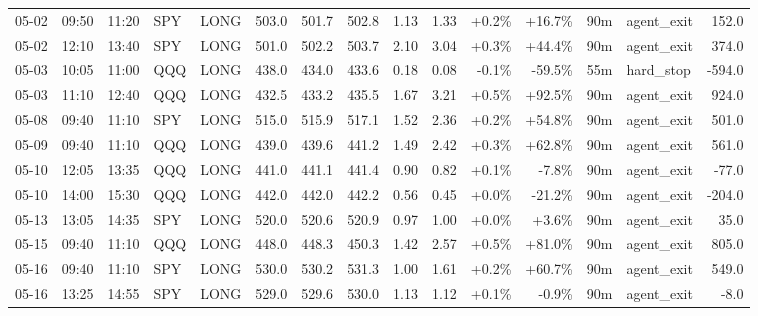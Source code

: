 \documentclass[11pt,a4paper,twoside]{article}
\begin{document}
\begin{landscape}
\begin{center}
\begin{longtable}{>{\color{txtmain}}l l l l l r r r r r r r r >{\color{txtmain}}l r}
05-02 & 09:50 & 11:20 & SPY & LONG & 503.0 & 501.7 & 502.8 & 1.13 & 1.33 & \textcolor{wingreen}{+0.2\%} & \textcolor{wingreen}{+16.7\%} & 90m & agent\_exit & \textcolor{wingreen}{152.0} \\
05-02 & 12:10 & 13:40 & SPY & LONG & 501.0 & 502.2 & 503.7 & 2.10 & 3.04 & \textcolor{wingreen}{+0.3\%} & \textcolor{wingreen}{+44.4\%} & 90m & agent\_exit & \textcolor{wingreen}{374.0} \\
05-03 & 10:05 & 11:00 & QQQ & LONG & 438.0 & 434.0 & 433.6 & 0.18 & 0.08 & \textcolor{lossred}{-0.1\%} & \textcolor{lossred}{-59.5\%} & 55m & hard\_stop & \textcolor{lossred}{-594.0} \\
05-03 & 11:10 & 12:40 & QQQ & LONG & 432.5 & 433.2 & 435.5 & 1.67 & 3.21 & \textcolor{wingreen}{+0.5\%} & \textcolor{wingreen}{+92.5\%} & 90m & agent\_exit & \textcolor{wingreen}{924.0} \\
05-08 & 09:40 & 11:10 & SPY & LONG & 515.0 & 515.9 & 517.1 & 1.52 & 2.36 & \textcolor{wingreen}{+0.2\%} & \textcolor{wingreen}{+54.8\%} & 90m & agent\_exit & \textcolor{wingreen}{501.0} \\
05-09 & 09:40 & 11:10 & QQQ & LONG & 439.0 & 439.6 & 441.2 & 1.49 & 2.42 & \textcolor{wingreen}{+0.3\%} & \textcolor{wingreen}{+62.8\%} & 90m & agent\_exit & \textcolor{wingreen}{561.0} \\
05-10 & 12:05 & 13:35 & QQQ & LONG & 441.0 & 441.1 & 441.4 & 0.90 & 0.82 & \textcolor{wingreen}{+0.1\%} & \textcolor{lossred}{-7.8\%} & 90m & agent\_exit & \textcolor{lossred}{-77.0} \\
05-10 & 14:00 & 15:30 & QQQ & LONG & 442.0 & 442.0 & 442.2 & 0.56 & 0.45 & \textcolor{wingreen}{+0.0\%} & \textcolor{lossred}{-21.2\%} & 90m & agent\_exit & \textcolor{lossred}{-204.0} \\
05-13 & 13:05 & 14:35 & SPY & LONG & 520.0 & 520.6 & 520.9 & 0.97 & 1.00 & \textcolor{wingreen}{+0.0\%} & \textcolor{wingreen}{+3.6\%} & 90m & agent\_exit & \textcolor{wingreen}{35.0} \\
05-15 & 09:40 & 11:10 & QQQ & LONG & 448.0 & 448.3 & 450.3 & 1.42 & 2.57 & \textcolor{wingreen}{+0.5\%} & \textcolor{wingreen}{+81.0\%} & 90m & agent\_exit & \textcolor{wingreen}{805.0} \\
05-16 & 09:40 & 11:10 & SPY & LONG & 530.0 & 530.2 & 531.3 & 1.00 & 1.61 & \textcolor{wingreen}{+0.2\%} & \textcolor{wingreen}{+60.7\%} & 90m & agent\_exit & \textcolor{wingreen}{549.0} \\
05-16 & 13:25 & 14:55 & SPY & LONG & 529.0 & 529.6 & 530.0 & 1.13 & 1.12 & \textcolor{wingreen}{+0.1\%} & \textcolor{lossred}{-0.9\%} & 90m & agent\_exit & \textcolor{lossred}{-8.0} \\

\end{longtable}
\end{center}
\end{landscape}
\end{document}
